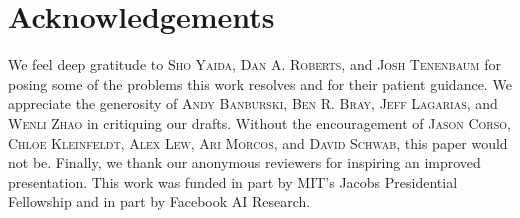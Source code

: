 \documentclass{article}
\theoremstyle{plain}
\theoremstyle{definition}
\begin{document}


            

\section*{Acknowledgements}

        We feel deep gratitude to
            \textsc{Sho Yaida},
            \textsc{Dan A. Roberts}, and
            \textsc{Josh Tenenbaum}
        for posing some of the problems this work resolves and for their
        patient guidance.  We appreciate the generosity of
            \textsc{Andy Banburski},
            \textsc{Ben R. Bray},
            \textsc{Jeff Lagarias}, and
            \textsc{Wenli Zhao}
        in critiquing our drafts.
        Without the encouragement of
            \textsc{Jason Corso},
            \textsc{Chloe Kleinfeldt},
            \textsc{Alex Lew}, 
            \textsc{Ari Morcos}, and
            \textsc{David Schwab},
        this paper would not be.
        Finally, we thank our anonymous reviewers for inspiring an improved
        presentation.
        This work was funded in part by MIT's Jacobs Presidential Fellowship
        and in part by Facebook AI Research.
        
\end{document}

